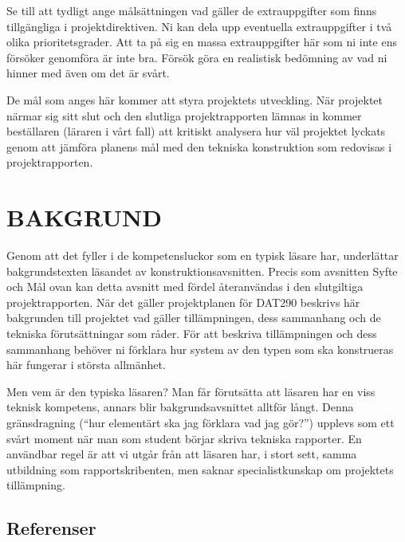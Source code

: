 \documentclass[a4paper]{article}
\begin{document}
Se till att tydligt ange målsättningen vad gäller de extrauppgifter som
finns tillgängliga i projektdirektiven. Ni kan dela upp eventuella
extrauppgifter i två olika prioritetsgrader. Att ta på sig en massa
extrauppgifter här som ni inte ens försöker genomföra är inte bra.
Försök göra en realistisk bedömning av vad ni hinner med även om det är
svårt.

De mål som anges här kommer att styra projektets utveckling. När
projektet närmar sig sitt slut och den slutliga projektrapporten lämnas
in kommer beställaren (läraren i vårt fall) att kritiskt analysera hur
väl projektet lyckats genom att jämföra planens mål med den tekniska
konstruktion som redovisas i projektrapporten.



\section{BAKGRUND}


Genom att det fyller i de kompetensluckor som en typisk läsare har,
underlättar bakgrundstexten läsandet av konstruktionsavsnitten. Precis
som avsnitten Syfte och Mål ovan kan detta avsnitt med fördel
återanvändas i den slutgiltiga projektrapporten. När det gäller
projektplanen för DAT290 beskrivs här bakgrunden till projektet vad
gäller tillämpningen, dess sammanhang och de tekniska förutsättningar
som råder. För att beskriva tillämpningen och dess sammanhang behöver ni
förklara hur system av den typen som ska konstrueras här fungerar i
största allmänhet.

Men vem är den typiska läsaren? Man får förutsätta att läsaren har en
viss teknisk kompetens, annars blir bakgrundsavsnittet alltför långt.
Denna gränsdragning (“hur elementärt ska jag förklara vad jag gör?”)
upplevs som ett svårt moment när man som student börjar skriva tekniska
rapporter. En användbar regel är att vi utgår från att läsaren har, i
stort sett, samma utbildning som rapportskribenten, men saknar
specialistkunskap om projektets tillämpning.


\subsection{Referenser}
\end{document}
